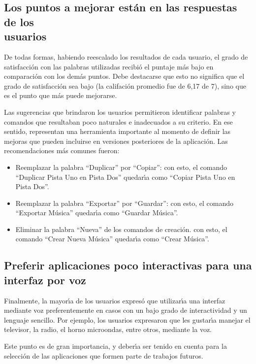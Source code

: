 \subsection[Los puntos a mejorar est\'an en las respuestas de los usuarios]
{Los puntos a mejorar est\'an en las respuestas de los \\ usuarios}
De todas formas, habiendo reescalado los resultados de cada usuario, el grado de satisfacci\'on
con las palabras utilizadas recibi\'o el puntaje m\'as bajo en comparaci\'on con los dem\'as puntos.
Debe destacarse que esto no significa que el grado de satisfacci\'on sea bajo (la califaci\'on promedio
fue de 6,17 de 7), sino que es el punto que m\'as puede mejorarse.

Las sugerencias que brindaron los usuarios permitieron identificar palabras y comandos que 
resultaban poco naturales e inadecuados a su criterio. En ese sentido, representan una herramienta
importante al momento de definir las mejoras que pueden incluirse en versiones posteriores de la
aplicaci\'on. Las recomendaciones m\'as comunes fueron:

\begin{itemize}
	\item Reemplazar la palabra ``Duplicar'' por ``Copiar'': con esto, el comando 
	``Duplicar Pista Uno en Pista Dos'' quedar{{\'\i}}a como ``Copiar Pista Uno en Pista Dos''. 
	\item Reemplazar la palabra ``Exportar'' por ``Guardar'': con esto, el comando 
	``Exportar M\'usica'' quedar{{\'\i}}a como ``Guardar M\'usica''.
	\item Eliminar la palabra ``Nueva'' de los comandos de creaci\'on. con esto, el comando 
	``Crear Nueva M\'usica'' quedar{{\'\i}}a como ``Crear M\'usica''.
\end{itemize}

\subsection{Preferir aplicaciones poco interactivas para una interfaz por voz}
Finalmente, la mayor{{\'\i}}a de los usuarios expres\'o que utilizar{{\'\i}}a una interfaz mediante voz
preferentemente en casos con un bajo grado de interactividad y un lenguaje sencillo.
Por ejemplo, los usuarios expresaron que les gustar{{\'\i}}a manejar el televisor, la radio, 
el horno microondas, entre otros, mediante la voz.

Este punto es de gran importancia, y deber{\'\i}a ser tenido en cuenta para la selecci\'on de las aplicaciones
que formen parte de trabajos futuros.
